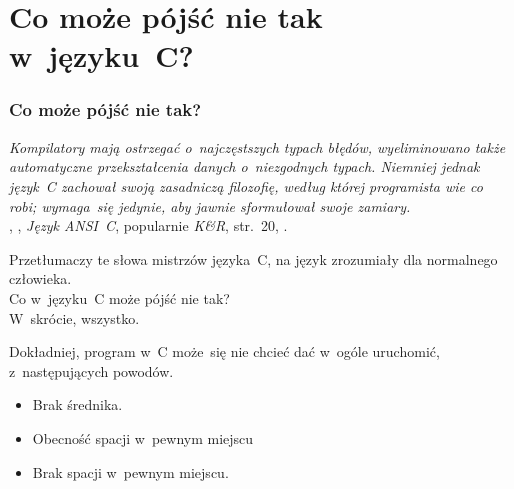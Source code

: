 \documentclass[10pt,t]{beamer}
\begin{document}
\section{Co może pójść nie tak w~języku~C?}


\begin{frame}
  \frametitle{Co może pójść nie tak?}


  \textit{Kompilatory mają ostrzegać o~najczęstszych typach błędów,
    wyeliminowano także automatyczne przekształcenia danych o~niezgodnych
    typach. Niemniej jednak język~C zachował swoją zasadniczą filozofię,
    według której programista wie co robi; wymaga~się jedynie, aby jawnie
    sformułował swoje zamiary.} \\
  ,
  , \textit{Język ANSI~C}, popularnie
  \textit{K\&R}, str.~20,
  \parencite{Kernighan-Ritchie-Jezyk-ANSI-C-Pub-2004}.

  Przetłumaczy te słowa mistrzów języka~C, na język zrozumiały dla
  normalnego człowieka. \\
  Co w~języku~C może pójść nie tak? \\
  W~skrócie, wszystko.

  Dokładniej, program w~C może~się nie chcieć dać w~ogóle uruchomić,
  z~następujących powodów.

  \vspace{-0.5em}



  \begin{itemize}

  \item Brak średnika.

  \item Obecność spacji w~pewnym miejscu

  \item Brak spacji w~pewnym miejscu.

  \end{itemize}

\end{frame}
\end{document}
